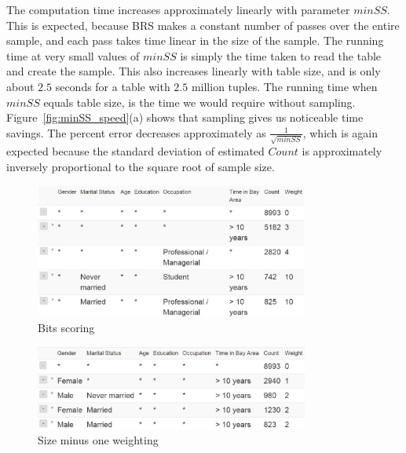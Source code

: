 The computation time increases approximately linearly with parameter $minSS$. This is expected, because BRS makes a constant number of passes over the entire sample, and each pass takes time linear in the size of the sample. The running time at very small values of $minSS$ is simply the time taken to read the table and create the sample. This also increases linearly with table size, and is only about $2.5$ seconds for a table with $2.5$ million tuples. The running time when $minSS$ equals table size, is the time we would require without sampling. Figure~\ref{fig:minSS_speed}(a) shows that sampling gives us noticeable time savings. The percent error decreases approximately as $\frac{1}{\sqrt{minSS}}$, which is again expected because the standard deviation of estimated $Count$ is approximately inversely proportional to the square root of sample size.


\begin{figure}
\vspace{-5pt}
\centering
\includegraphics[width=90mm]{graphs/screenshots6col/bits_scoring.jpg}
\caption{Bits scoring\label{fig:weigtingbitwise}}
\end{figure}

\begin{figure}
\vspace{-5pt}
\centering
\includegraphics[width=90mm]{graphs/screenshots6col/min2_scoring.jpg}
\vspace{-10pt}
\caption{Size minus one weighting \label{fig:weightingsizeminusone}}
\vspace{-15pt}
\end{figure}

